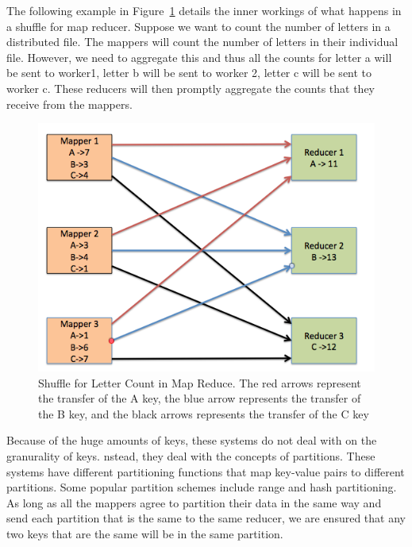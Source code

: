 The following example in Figure~\ref{fig:shuffle_basic} details the inner workings 
of what happens in a shuffle for map reducer. Suppose we want to count the 
number of letters in a distributed file. The mappers will count the number of
letters in their individual file. However, we need to aggregate this and 
thus all the counts for letter a will be sent to worker1, letter b will be sent to worker 2,
letter c will be sent to worker c. These reducers will then promptly aggregate the counts that they receive from the 
mappers.

\begin{figure}[h]
\begin{center}
\includegraphics[scale=1.0]{./img/shuffle_basic.png}
\caption{Shuffle for Letter Count in Map Reduce. The red arrows represent the transfer of the A key,
the blue arrow represents the transfer of the B key, and the black arrows represents the transfer of the C key}
\label{fig:shuffle_basic}
\end{center}
\end{figure}

Because of the huge amounts of keys, these systems do not deal with on the granurality of keys.
nstead, they deal with the concepts of partitions. These systems have different partitioning functions
that map key-value pairs to different partitions. Some popular partition schemes include range and hash partitioning.
As long as all the mappers agree to partition their data in the same way and send each partition that is the same to the same reducer, we are ensured that any two keys that are the same will be in the same partition. 

